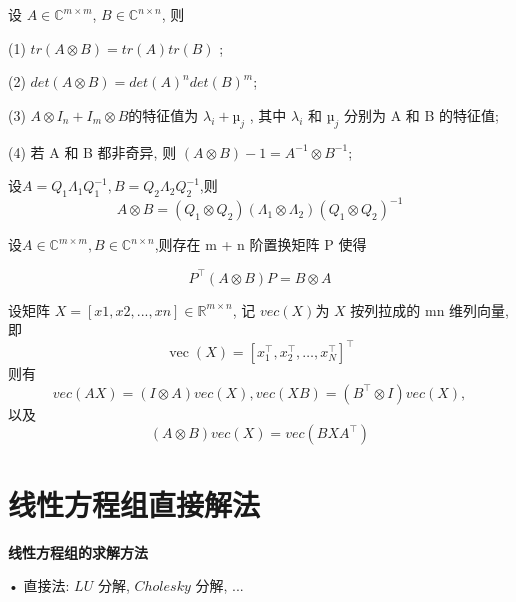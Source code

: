 \documentclass[12pt,a4paper]{article}
\begin{document}
\begin{framed}
	\begin{theorem}
		设 $A ∈ \mathbb{C}^{m×m}$, $B ∈ \mathbb{C}^{n×n}$, 则
		
		(1) $tr(A ⊗ B) = tr(A)tr(B)$ ;
		
		(2) $det(A ⊗ B) = det(A)^n det(B)^m $;
		
		(3) $A ⊗ I_n + I_m ⊗ B $的特征值为 $λ_i + µ_j$ , 其中 $λ_i$ 和 $µ_j$ 分别为 A 和 B 的特征值;
		
		(4) 若 A 和 B 都非奇异, 则 $(A ⊗ B)−1 = A^{−1} ⊗ B^{−1}$;	
	\end{theorem}
\end{framed}

\begin{framed}
	\begin{corollary}
		设$A=Q_{1} \Lambda_{1} Q_{1}^{-1}, B=Q_{2} \Lambda_{2} Q_{2}^{-1}$,则
		$$
		A \otimes B=\left(Q_{1} \otimes Q_{2}\right)\left(\Lambda_{1} \otimes \Lambda_{2}\right)\left(Q_{1} \otimes Q_{2}\right)^{-1}
		$$	
	\end{corollary}
\end{framed}

\begin{framed}
	\begin{theorem}
		设$A \in \mathbb{C}^{m \times m}, B \in \mathbb{C}^{n \times n}$,则存在 m + n 阶置换矩阵 P 使得
		
		$$
		P^{\top}(A \otimes B) P=B \otimes A
		$$
		
	\end{theorem}
\end{framed}

\begin{framed}
	\begin{theorem}
		设矩阵 $X = [x1, x2, . . . , xn] ∈ \mathbb{R}^{
		m×n}$, 记 $vec(X)$为 $X$ 按列拉成的
		mn 维列向量, 即
		$$
		\operatorname{vec}(X)=\left[x_{1}^{\top}, x_{2}^{\top}, \ldots, x_{N}^{\top}\right]^{\top}
		$$
		则有
		$$vec(AX) = (I ⊗ A)vec(X), vec(XB) = (B^{\top}⊗ I)vec(X),$$
		以及
		$$(A ⊗ B)vec(X) = vec(BXA^{\top}
		)$$
	\end{theorem}
\end{framed}

\newpage
\section{线性方程组直接解法}

{\bfseries 线性方程组的求解方法}

• 直接法: $LU$ 分解, $Cholesky$ 分解, ...
\end{document}

